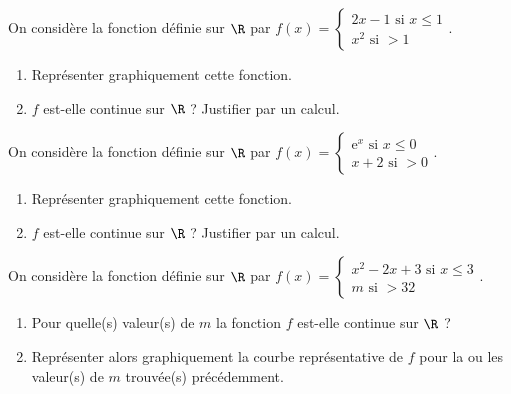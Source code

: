 \begin{exr}
On considère la fonction définie sur $ \R$ par 
$f(x)=\begin{cases}2x-1\text{ si }x\leqslant 1\\x^2\text{ si }>1\end{cases}$.
	\begin{enumerate}
	\item Représenter graphiquement cette fonction.
	\item $f$ est-elle continue sur $ \R$ ? Justifier par un calcul.
	\end{enumerate}
\end{exr}
%
%
%
\begin{exr}
On considère la fonction définie sur $ \R$ par 
$f(x)=\begin{cases}\mathrm{e}^{x}\text{ si }x\leqslant 0\\x+2\text{ si }>0\end{cases}$.
	\begin{enumerate}
	\item Représenter graphiquement cette fonction.
	\item $f$ est-elle continue sur $ \R$ ? Justifier par un calcul.
	\end{enumerate}
\end{exr}
%
%
%
\begin{exr}
On considère la fonction définie sur $ \R$ par 
$f(x)=\begin{cases}x^2-2x+3\text{ si }x\leqslant 3\\m\text{ si }>32\end{cases}$.
	\begin{enumerate}
	\item Pour quelle(s) valeur(s) de $m$ la fonction $f$ est-elle continue sur $ \R$ ?
	\item Représenter alors graphiquement  la courbe représentative de $f$ pour la ou les valeur(s) de $m$ trouvée(s) précédemment.
	\end{enumerate}
\end{exr}

\endinput
